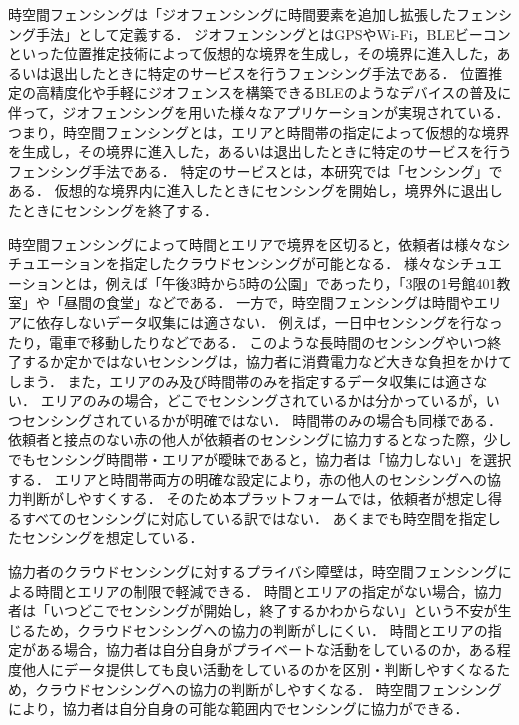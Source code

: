 時空間フェンシングは「ジオフェンシングに時間要素を追加し拡張したフェンシング手法」として定義する．
ジオフェンシングとはGPSやWi-Fi，BLEビーコンといった位置推定技術によって仮想的な境界を生成し，その境界に進入した，あるいは退出したときに特定のサービスを行うフェンシング手法である．
位置推定の高精度化や手軽にジオフェンスを構築できるBLEのようなデバイスの普及に伴って，ジオフェンシングを用いた様々なアプリケーションが実現されている．
つまり，時空間フェンシングとは，エリアと時間帯の指定によって仮想的な境界を生成し，その境界に進入した，あるいは退出したときに特定のサービスを行うフェンシング手法である．
特定のサービスとは，本研究では「センシング」である．
仮想的な境界内に進入したときにセンシングを開始し，境界外に退出したときにセンシングを終了する．

時空間フェンシングによって時間とエリアで境界を区切ると，依頼者は様々なシチュエーションを指定したクラウドセンシングが可能となる．
様々なシチュエーションとは，例えば「午後3時から5時の公園」であったり，「3限の1号館401教室」や「昼間の食堂」などである．
一方で，時空間フェンシングは時間やエリアに依存しないデータ収集には適さない．
例えば，一日中センシングを行なったり，電車で移動したりなどである．
このような長時間のセンシングやいつ終了するか定かではないセンシングは，協力者に消費電力など大きな負担をかけてしまう．
また，エリアのみ及び時間帯のみを指定するデータ収集には適さない．
エリアのみの場合，どこでセンシングされているかは分かっているが，いつセンシングされているかが明確ではない．
時間帯のみの場合も同様である．
依頼者と接点のない赤の他人が依頼者のセンシングに協力するとなった際，少しでもセンシング時間帯・エリアが曖昧であると，協力者は「協力しない」を選択する．
エリアと時間帯両方の明確な設定により，赤の他人のセンシングへの協力判断がしやすくする．
そのため本プラットフォームでは，依頼者が想定し得るすべてのセンシングに対応している訳ではない．
あくまでも時空間を指定したセンシングを想定している．

協力者のクラウドセンシングに対するプライバシ障壁は，時空間フェンシングによる時間とエリアの制限で軽減できる．
時間とエリアの指定がない場合，協力者は「いつどこでセンシングが開始し，終了するかわからない」という不安が生じるため，クラウドセンシングへの協力の判断がしにくい．
時間とエリアの指定がある場合，協力者は自分自身がプライベートな活動をしているのか，ある程度他人にデータ提供しても良い活動をしているのかを区別・判断しやすくなるため，クラウドセンシングへの協力の判断がしやすくなる．
時空間フェンシングにより，協力者は自分自身の可能な範囲内でセンシングに協力ができる．

